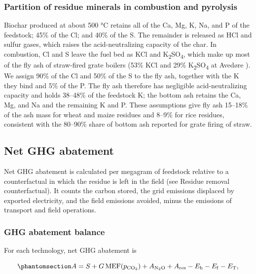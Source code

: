 \documentclass[
  letterpaper,
  twoside,
  twocolumn,
  9pt]{article}
\begin{document}
\subsubsection{Partition of residue minerals in combustion and
pyrolysis}\label{partition-of-residue-minerals-in-combustion-and-pyrolysis}

Biochar produced at about 500 °C retains all of the Ca, Mg, K, Na, and P
of the feedstock; 45\% of the Cl; and 40\% of the S. The remainder is
released as HCl and sulfur gases, which raises the acid-neutralizing
capacity of the char.\citep{saleh2014, knudsen2004} In combustion, Cl
and S leave the fuel bed as KCl and
K\textsubscript{2}SO\textsubscript{4}, which make up most of the fly ash
of straw-fired grate boilers (53\% KCl and 29\%
K\textsubscript{2}SO\textsubscript{4} at Avedøre \citep{thomsen2006}).
We assign 90\% of the Cl and 50\% of the S to the fly ash, together with
the K they bind and 5\% of the P. The fly ash therefore has negligible
acid-neutralizing capacity and holds 38--48\% of the feedstock K; the
bottom ash retains the Ca, Mg, and Na and the remaining K and P. These
assumptions give fly ash 15--18\% of the ash mass for wheat and maize
residues and 8--9\% for rice residues, consistent with the 80--90\%
share of bottom ash reported for grate firing of
straw.\citep{lamers2018}

\subsection{Net GHG abatement}\label{net-ghg-abatement}

Net GHG abatement is calculated per megagram of feedstock relative to a
counterfactual in which the residue is left in the field (see Residue
removal counterfactual). It counts the carbon stored, the grid emissions
displaced by exported electricity, and the field emissions avoided,
minus the emissions of transport and field operations.

\subsubsection{GHG abatement balance}\label{ghg-abatement-balance}

For each technology, net GHG abatement is

\begin{equation}\phantomsection\label{eq-abatement}{A = S + G\, \mathrm{MEF}(p_{\mathrm{CO_2}}) + A_{\mathrm{N_2O}} + A_{\mathrm{res}} - E_{\mathrm{h}} - E_{\mathrm{f}} - E_{\mathrm{T}},}\end{equation}
\end{document}
